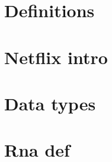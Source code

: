 
\section*{Definitions}

\vfill
\section*{Netflix intro}

\vfill
\section*{Data types}

\vfill
\section*{Rna def}

\vfill
